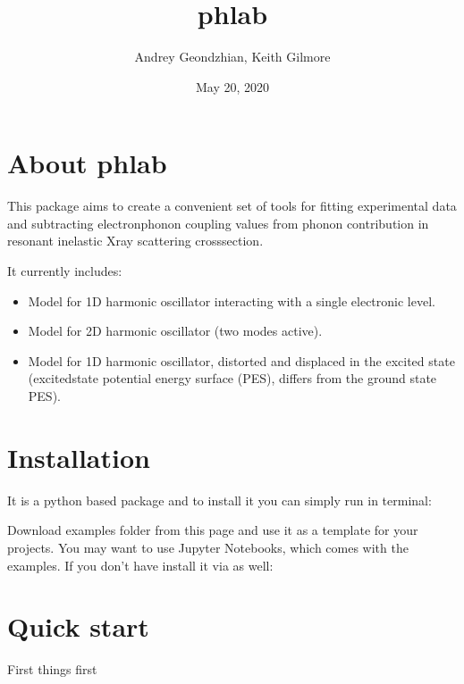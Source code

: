 \documentclass[letterpaper,10pt,english]{sphinxmanual}
\title{phlab}
\date{May 20, 2020}
\author{Andrey Geondzhian, Keith Gilmore}
\begin{document}
\pagestyle{empty}
\sphinxmaketitle
\pagestyle{plain}
\sphinxtableofcontents
\pagestyle{normal}
\label{\detokenize{index::doc}}



\chapter{About phlab}
\label{\detokenize{about:about-phlab}}\label{\detokenize{about::doc}}
This package aims to create a convenient set of tools for fitting experimental data and subtracting electron\sphinxhyphen{}phonon coupling values from phonon contribution in resonant inelastic X\sphinxhyphen{}ray scattering cross\sphinxhyphen{}section.

It currently includes:
\begin{itemize}
\item {} 
Model for 1D harmonic oscillator interacting with a single electronic level.

\item {} 
Model for 2D harmonic oscillator (two modes active).

\item {} 
Model for 1D harmonic oscillator, distorted and displaced in the excited state (excited\sphinxhyphen{}state potential energy surface (PES), differs from the ground state PES).

\end{itemize}


\chapter{Installation}
\label{\detokenize{installation:installation}}\label{\detokenize{installation::doc}}
It is a python based package and to install it you can simply run in terminal:


Download examples folder from this page and use it as a template for your projects. You may want to use Jupyter Notebooks, which comes with the examples. If you don’t have  install it  via  as well:



\chapter{Quick start}
\label{\detokenize{quickstart/index:quick-start}}\label{\detokenize{quickstart/index::doc}}
First things first
\end{document}
